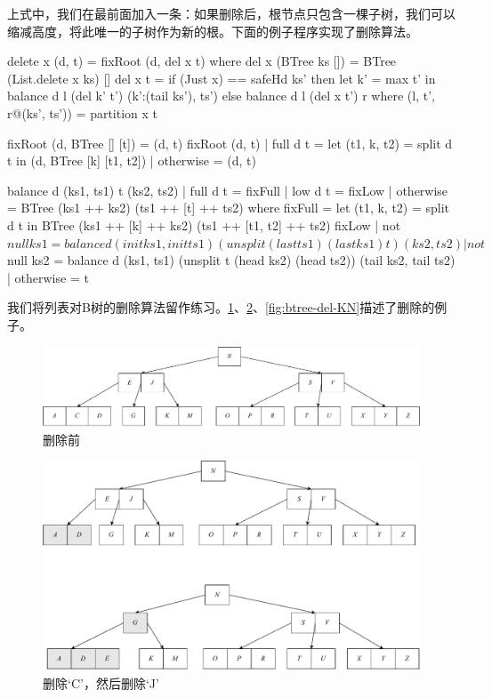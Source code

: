 \documentclass[b5paper]{ctexart}
\begin{document}
上式中，我们在最前面加入一条：如果删除后，根节点只包含一棵子树，我们可以缩减高度，将此唯一的子树作为新的根。下面的例子程序实现了删除算法。

\begin{Haskell}
delete x (d, t) = fixRoot (d, del x t) where
    del x (BTree ks []) = BTree (List.delete x ks) []
    del x t = if (Just x) == safeHd ks' then
                let k' = max t' in
                   balance d l (del k' t') (k':(tail ks'), ts')
              else balance d l (del x t') r
      where
        (l, t', r@(ks', ts')) = partition x t

fixRoot (d, BTree [] [t]) = (d, t)
fixRoot (d, t) | full d t  = let (t1, k, t2) = split d t in
                               (d, BTree [k] [t1, t2])
               | otherwise = (d, t)

balance d (ks1, ts1) t (ks2, ts2)
    | full d t  = fixFull
    | low  d t  = fixLow
    | otherwise = BTree (ks1 ++ ks2) (ts1 ++ [t] ++ ts2)
  where
    fixFull = let (t1, k, t2) = split d t in
                BTree (ks1 ++ [k] ++ ks2) (ts1 ++ [t1, t2] ++ ts2)
    fixLow | not $ null ks1 = balance d (init ks1, init ts1)
                                      (unsplit (last ts1) (last ks1) t)
                                      (ks2, ts2)
           | not $ null ks2 = balance d (ks1, ts1)
                                      (unsplit t (head ks2) (head ts2))
                                      (tail ks2, tail ts2)
           | otherwise = t
\end{Haskell}

我们将列表对B树的删除算法留作练习。\cref{fig:btree-del-before}、\cref{fig:btree-del-CJ}、\cref{fig:btree-del-KN}描述了删除的例子。

\begin{figure}[htbp]
  \centering
  \includegraphics[scale=0.33]{img/btree-del-before}
  \caption{删除前}
  \label{fig:btree-del-before}
\end{figure}

\begin{figure}[htbp]
  \centering
  \includegraphics[scale=0.33]{img/btree-del-CJ}
  \caption{删除`C'，然后删除`J'}
  \label{fig:btree-del-CJ}
\end{figure}
\end{document}
